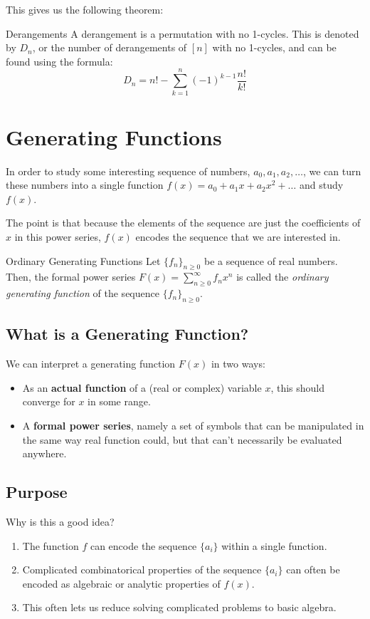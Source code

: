 \documentclass[letterpaper]{article}
\begin{document}
This gives us the following theorem: 
\begin{definition}{Derangements}{}
    A derangement is a permutation with no 1-cycles. This is denoted by $D_n$, or the number of derangements of $[n]$ with no 1-cycles, and can be found using the formula:
    \[D_n = n! - \sum_{k = 1}^n (-1)^{k - 1} \frac{n!}{k!}\]
\end{definition}



\newpage 
\section{Generating Functions}
In order to study some interesting sequence of numbers, $a_0, a_1, a_2, \dots$, we can turn these numbers into a single function $f(x) = a_0 + a_{1}x + a_{2}x^2 + \dots$ and study $f(x)$. 

\bigskip 

The point is that because the elements of the sequence are just the coefficients of $x$ in this power series, $f(x)$ encodes the sequence that we are interested in.

\begin{definition}{Ordinary Generating Functions}{}
    Let $\{f_n\}_{n \geq 0}$ be a sequence of real numbers. Then, the formal power series $F(x) = \sum_{n \geq 0}^{\infty} f_n x^n$ is called the \emph{ordinary generating function} of the sequence $\{f_n\}_{n \geq 0}$. 
\end{definition}

\subsection{What is a Generating Function?}
We can interpret a generating function $F(x)$ in two ways: 
\begin{itemize}
    \item As an \textbf{actual function} of a (real or complex) variable $x$, this should converge for $x$ in some range. 
    \item A \textbf{formal power series}, namely a set of symbols that can be manipulated in the same way real function could, but that can't necessarily be evaluated anywhere. 
\end{itemize}


\subsection{Purpose}
Why is this a good idea? 
\begin{enumerate}
    \item The function $f$ can encode the sequence $\{a_i\}$ within a single function. 
    \item Complicated combinatorical properties of the sequence $\{a_i\}$ can often be encoded as algebraic or analytic properties of $f(x)$. 
    \item This often lets us reduce solving complicated problems to basic algebra.  
\end{enumerate}
\end{document}
